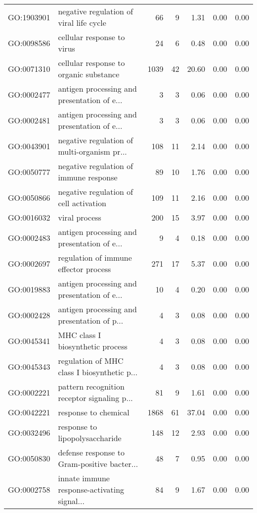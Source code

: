\begin{table}[ht]
\begin{tabular}{llrrrrr}
  GO:1903901 & negative regulation of viral life cycle &  66 &   9 & 1.31 & 0.00 & 0.00 \\ 
  GO:0098586 & cellular response to virus &  24 &   6 & 0.48 & 0.00 & 0.00 \\ 
  GO:0071310 & cellular response to organic substance & 1039 &  42 & 20.60 & 0.00 & 0.00 \\ 
  GO:0002477 & antigen processing and presentation of e... &   3 &   3 & 0.06 & 0.00 & 0.00 \\ 
  GO:0002481 & antigen processing and presentation of e... &   3 &   3 & 0.06 & 0.00 & 0.00 \\ 
  GO:0043901 & negative regulation of multi-organism pr... & 108 &  11 & 2.14 & 0.00 & 0.00 \\ 
  GO:0050777 & negative regulation of immune response &  89 &  10 & 1.76 & 0.00 & 0.00 \\ 
  GO:0050866 & negative regulation of cell activation & 109 &  11 & 2.16 & 0.00 & 0.00 \\ 
  GO:0016032 & viral process & 200 &  15 & 3.97 & 0.00 & 0.00 \\ 
  GO:0002483 & antigen processing and presentation of e... &   9 &   4 & 0.18 & 0.00 & 0.00 \\ 
  GO:0002697 & regulation of immune effector process & 271 &  17 & 5.37 & 0.00 & 0.00 \\ 
  GO:0019883 & antigen processing and presentation of e... &  10 &   4 & 0.20 & 0.00 & 0.00 \\ 
  GO:0002428 & antigen processing and presentation of p... &   4 &   3 & 0.08 & 0.00 & 0.00 \\ 
  GO:0045341 & MHC class I biosynthetic process &   4 &   3 & 0.08 & 0.00 & 0.00 \\ 
  GO:0045343 & regulation of MHC class I biosynthetic p... &   4 &   3 & 0.08 & 0.00 & 0.00 \\ 
  GO:0002221 & pattern recognition receptor signaling p... &  81 &   9 & 1.61 & 0.00 & 0.00 \\ 
  GO:0042221 & response to chemical & 1868 &  61 & 37.04 & 0.00 & 0.00 \\ 
  GO:0032496 & response to lipopolysaccharide & 148 &  12 & 2.93 & 0.00 & 0.00 \\ 
  GO:0050830 & defense response to Gram-positive bacter... &  48 &   7 & 0.95 & 0.00 & 0.00 \\ 
  GO:0002758 & innate immune response-activating signal... &  84 &   9 & 1.67 & 0.00 & 0.00 \\ 

\end{tabular}
\end{table}

